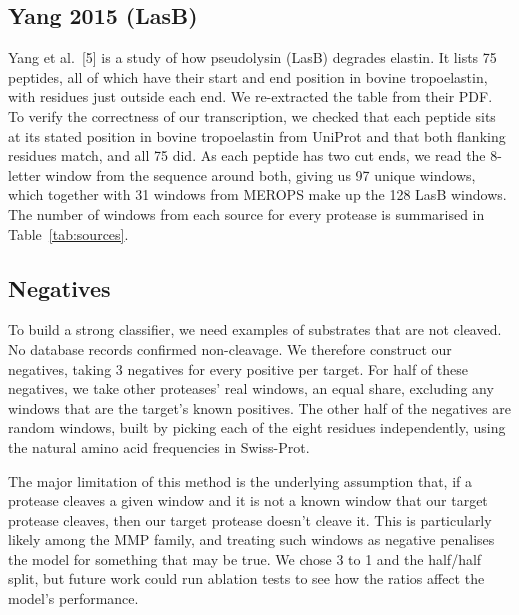 \documentclass[10pt,a4paper]{article}
\numberwithin{equation}{section}
\newcommand{\cit}[1]{[#1]}
\begin{document}
\subsection{Yang 2015 (LasB)}

Yang et al.~\cit{5} is a study of how pseudolysin (LasB) degrades elastin. It lists 75 peptides, all of which have their start and end position in bovine tropoelastin, with residues just outside each end. We re-extracted the table from their PDF. To verify the correctness of our transcription, we checked that each peptide sits at its stated position in bovine tropoelastin from UniProt and that both flanking residues match, and all 75 did. As each peptide has two cut ends, we read the 8-letter window from the sequence around both, giving us 97 unique windows, which together with 31 windows from MEROPS make up the 128 LasB windows. The number of windows from each source for every protease is summarised in Table~\ref{tab:sources}.

\subsection{Negatives}

To build a strong classifier, we need examples of substrates that are not cleaved. No database records confirmed non-cleavage. We therefore construct our negatives, taking 3 negatives for every positive per target. For half of these negatives, we take other proteases' real windows, an equal share, excluding any windows that are the target's known positives. The other half of the negatives are random windows, built by picking each of the eight residues independently, using the natural amino acid frequencies in Swiss-Prot.

The major limitation of this method is the underlying assumption that, if a protease cleaves a given window and it is not a known window that our target protease cleaves, then our target protease doesn't cleave it. This is particularly likely among the MMP family, and treating such windows as negative penalises the model for something that may be true. We chose 3 to 1 and the half/half split, but future work could run ablation tests to see how the ratios affect the model's performance.
\end{document}
